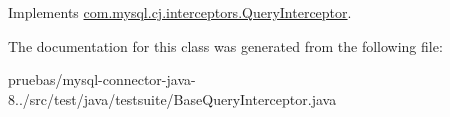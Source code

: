 Implements \mbox{\hyperlink{interfacecom_1_1mysql_1_1cj_1_1interceptors_1_1_query_interceptor_a1613f5491fdb4610d5727d60c904e7e2}{com.\+mysql.\+cj.\+interceptors.\+Query\+Interceptor}}.



The documentation for this class was generated from the following file\+:\begin{DoxyCompactItemize}
\item 
pruebas/mysql-\/connector-\/java-\/8../src/test/java/testsuite/Base\+Query\+Interceptor.\+java\end{DoxyCompactItemize}
